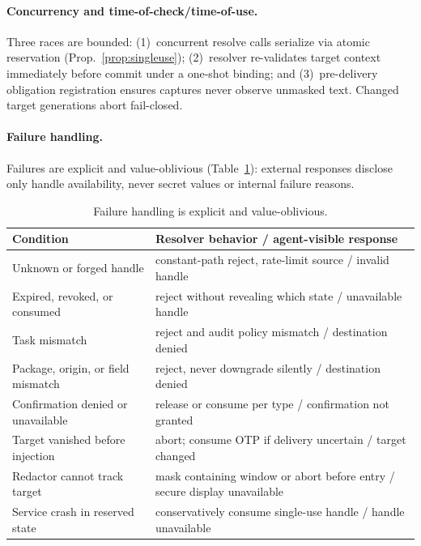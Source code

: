 \documentclass[sigconf,10pt]{acmart}
\theoremstyle{acmplain}%
\begin{document}
\paragraph{Concurrency and time-of-check/time-of-use.} Three races are bounded: (1)~concurrent resolve calls serialize via atomic reservation (Prop.~\ref{prop:singleuse}); (2)~resolver re-validates target context immediately before commit under a one-shot binding; and (3)~pre-delivery obligation registration ensures captures never observe unmasked text. Changed target generations abort fail-closed.

\paragraph{Failure handling.} Failures are explicit and value-oblivious (Table~\ref{tab:failures}): external responses disclose only handle availability, never secret values or internal failure reasons.

\begin{table}[t]
\centering
\caption{Failure handling is explicit and value-oblivious.}
\label{tab:failures}
\footnotesize
\renewcommand{\arraystretch}{1.08}
\begin{tabularx}{\columnwidth}{@{}>{\raggedright\arraybackslash}p{2.35cm}>{\raggedright\arraybackslash}X@{}}
\toprule
Condition & Resolver behavior / agent-visible response \\
\midrule
Unknown or forged handle & constant-path reject, rate-limit source / invalid handle \\
Expired, revoked, or consumed & reject without revealing which state / unavailable handle \\
Task mismatch & reject and audit policy mismatch / destination denied \\
Package, origin, or field mismatch & reject, never downgrade silently / destination denied \\
Confirmation denied or unavailable & release or consume per type / confirmation not granted \\
Target vanished before injection & abort; consume OTP if delivery uncertain / target changed \\
Redactor cannot track target & mask containing window or abort before entry / secure display unavailable \\
Service crash in reserved state & conservatively consume single-use handle / handle unavailable \\
\bottomrule
\end{tabularx}
\end{table}
\end{document}

